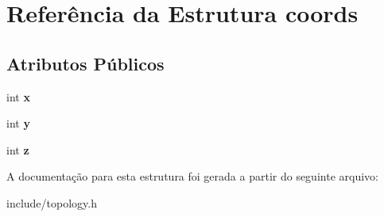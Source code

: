 \hypertarget{structcoords}{
\section{Referência da Estrutura coords}
\label{structcoords}
}
\subsection*{Atributos Públicos}
\begin{DoxyCompactItemize}
\item 
\hypertarget{structcoords_a55b1781a26c892c1b25f0044f29325ec}{
int {\bfseries x}}
\label{structcoords_a55b1781a26c892c1b25f0044f29325ec}

\item 
\hypertarget{structcoords_afce80f4c8ef6efe7b806bcdda0c49d2d}{
int {\bfseries y}}
\label{structcoords_afce80f4c8ef6efe7b806bcdda0c49d2d}

\item 
\hypertarget{structcoords_a2e43171fadc37919f6ba915d1be25a5b}{
int {\bfseries z}}
\label{structcoords_a2e43171fadc37919f6ba915d1be25a5b}

\end{DoxyCompactItemize}


A documentação para esta estrutura foi gerada a partir do seguinte arquivo:\begin{DoxyCompactItemize}
\item 
include/topology.h\end{DoxyCompactItemize}
